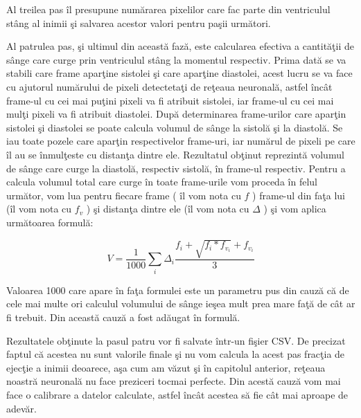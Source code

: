 \par

Al treilea pas \^{i}l presupune num\u{a}rarea pixelilor care fac parte din ventriculul st\^{a}ng al inimii \c{s}i salvarea acestor valori pentru pa\c{s}ii urm\u{a}tori.

\par 

Al patrulea pas, \c{s}i ultimul din aceast\u{a} faz\u{a}, este calcularea efectiva a cantit\u{a}\c{t}ii de s\^{a}nge care curge prin ventriculul st\^{a}ng la momentul respectiv. Prima dat\u{a} se va stabili care frame apar\c{t}ine sistolei \c{s}i care apar\c{t}ine diastolei, acest lucru se va face cu ajutorul num\u{a}rului de pixeli detecteta\c{t}i de re\c{t}eaua neuronal\u{a}, astfel \^{i}nc\^{a}t frame-ul cu cei mai pu\c{t}ini pixeli va fi atribuit  sistolei, iar frame-ul cu cei mai mul\c{t}i pixeli va fi atribuit diastolei. Dup\u{a} determinarea frame-urilor care apar\c{t}in sistolei \c{s}i diastolei se poate calcula volumul de s\^{a}nge la sistol\u{a} \c{s}i la diastol\u{a}. Se iau toate pozele care apar\c{t}in respectivelor frame-uri, iar num\u{a}rul de pixeli pe care \^{i}l au se \^{i}nmul\c{t}este cu distan\c{t}a dintre ele. Rezultatul ob\c{t}inut reprezint\u{a} volumul de s\^{a}nge care curge la diastol\u{a}, respectiv sistol\u{a}, \^{i}n frame-ul respectiv. Pentru a calcula volumul total care curge \^{i}n toate frame-urile vom proceda \^{i}n felul urm\u{a}tor, vom lua pentru fiecare frame ( \^{i}l vom nota cu $f$ ) frame-ul din fa\c{t}a lui (\^{i}l vom nota cu $f_v$ ) \c{s}i distan\c{t}a dintre ele (\^{i}l vom nota cu $\Delta$ ) \c{s}i vom aplica urm\u{a}toarea formul\u{a}:

$$ V = \frac{1}{1000} \sum_i \Delta_i \frac{f_i + \sqrt{f_i * f_{v_i}} + f_{v_i}}{3} $$

Valoarea 1000 care apare \^{i}n fa\c{t}a formulei este un parametru pus din cauz\u{a} c\u{a} de cele mai multe ori calculul volumului de s\^{a}nge ie\c{s}ea mult prea mare fa\c{t}\u{a} de c\^{a}t ar fi trebuit. Din aceast\u{a} cauz\u{a} a fost ad\u{a}ugat \^{i}n formul\u{a}.

\par

Rezultatele ob\c{t}inute la pasul patru vor fi salvate \^{i}ntr-un fi\c{s}ier CSV. De precizat faptul c\u{a} acestea nu sunt valorile finale \c{s}i nu vom calcula la acest pas frac\c{t}ia de ejec\c{t}ie a inimii deoarece, a\c{s}a cum am v\u{a}zut \c{s}i \^{i}n capitolul anterior, re\c{t}eaua noastr\u{a} neuronal\u{a} nu face preziceri tocmai perfecte. Din acest\u{a} cauz\u{a} vom mai face o calibrare a datelor calculate, astfel \^{i}nc\^{a}t acestea s\u{a} fie c\^{a}t mai aproape de adev\u{a}r.

